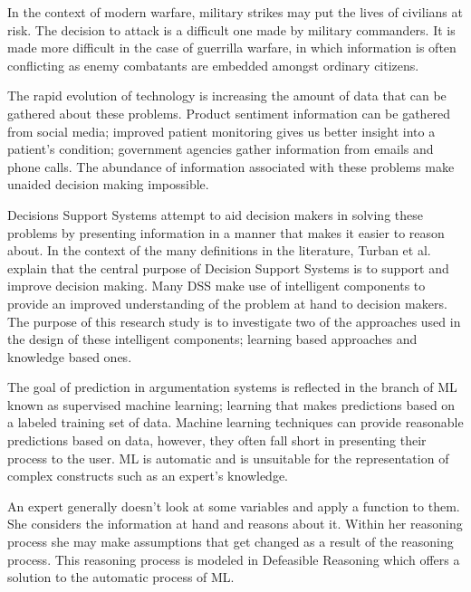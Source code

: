 In the context of modern warfare, military strikes may put the lives of civilians at risk. The decision to attack is a difficult one made by military commanders. It is made more difficult in the case of guerrilla warfare, in which information is often conflicting as enemy combatants are embedded amongst ordinary citizens.

The rapid evolution of technology is increasing the amount of data that can be gathered about these problems. Product sentiment information can be gathered from social media; improved patient monitoring gives us better insight into a patient’s condition; government agencies gather information from emails and phone calls. The abundance of information associated with these problems make unaided decision making impossible. 

Decisions Support Systems attempt to aid decision makers in solving these problems by presenting information in a manner that makes it easier to reason about. In the context of the many definitions in the literature, Turban et al.\cite{turban2005decision} explain that the central purpose of Decision Support Systems is to support and improve decision making. Many DSS make use of intelligent components to provide an improved understanding of the problem at hand to decision makers. The purpose of this research study is to investigate two of the approaches used in the design of these intelligent components; learning based approaches and knowledge based ones.

The goal of prediction in argumentation systems is reflected in the branch of ML known as supervised machine learning; learning that makes predictions based on a labeled training set of data. Machine learning techniques can provide reasonable predictions based on data, however, they often fall short in presenting their process to the user. ML is automatic and is unsuitable for the representation of complex constructs such as an expert's knowledge.

An expert generally doesn't look at some variables and apply a function to them. She considers the information at hand and reasons about it. Within her reasoning process she may make assumptions that get changed as a result of the reasoning process. This reasoning process is modeled in Defeasible Reasoning which offers a solution to the automatic process of ML.


